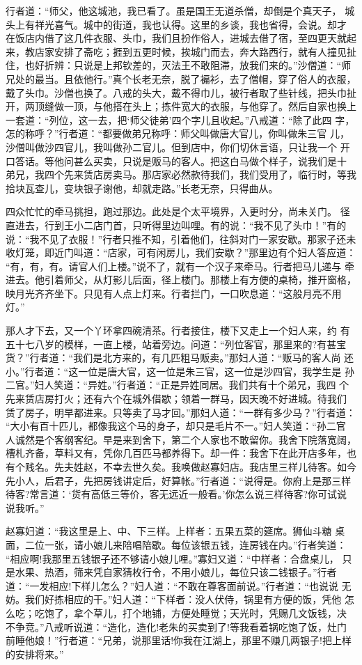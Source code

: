 行者道：“师父，他这城池，我已看了。虽是国王无道杀僧，却倒是个真天子，
城头上有祥光喜气。城中的街道，我也认得。这里的乡谈，我也省得，会说。却才
在饭店内借了这几件衣服、头巾，我们且扮作俗人，进城去借了宿，至四更天就起
来，教店家安排了斋吃；捱到五更时候，挨城门而去，奔大路西行，就有人撞见扯
住，也好折辨：只说是上邦钦差的，灭法王不敢阻滞，放我们来的。”沙僧道：“师
兄处的最当。且依他行。”真个长老无奈，脱了褊衫，去了僧帽，穿了俗人的衣服，
戴了头巾。沙僧也换了。八戒的头大，戴不得巾儿，被行者取了些针线，把头巾扯
开，两顶缝做一顶，与他搭在头上；拣件宽大的衣服，与他穿了。然后自家也换上
一套道：“列位，这一去，把‘师父徒弟’四个字儿且收起。”八戒道：“除了此四
字，怎的称呼？”行者道：“都要做弟兄称呼：师父叫做唐大官儿，你叫做朱三官
儿，沙僧叫做沙四官儿，我叫做孙二官儿。但到店中，你们切休言语，只让我一个
开口答话。等他问甚么买卖，只说是贩马的客人。把这白马做个样子，说我们是十
弟兄，我四个先来赁店房卖马。那店家必然款待我们，我们受用了，临行时，等我
拾块瓦查儿，变块银子谢他，却就走路。”长老无奈，只得曲从。

四众忙忙的牵马挑担，跑过那边。此处是个太平境界，入更时分，尚未关门。
径直进去，行到王小二店门首，只听得里边叫哩。有的说：“我不见了头巾！”有的
说：“我不见了衣服！”行者只推不知，引着他们，往斜对门一家安歇。那家子还未
收灯笼，即近门叫道：“店家，可有闲房儿，我们安歇？”那里边有个妇人答应道：
“有，有，有。请官人们上楼。”说不了，就有一个汉子来牵马。行者把马儿递与
牵进去。他引着师父，从灯影儿后面，径上楼门。那楼上有方便的桌椅，推开窗格，
映月光齐齐坐下。只见有人点上灯来。行者拦门，一口吹息道：“这般月亮不用灯。”

那人才下去，又一个丫环拿四碗清茶。行者接住，楼下又走上一个妇人来，约
有五十七八岁的模样，一直上楼，站着旁边。问道：“列位客官，那里来的?有甚宝
货？”行者道：“我们是北方来的，有几匹粗马贩卖。”那妇人道：“贩马的客人尚
还小。”行者道：“这一位是唐大官，这一位是朱三官，这一位是沙四官，我学生是
孙二官。”妇人笑道：“异姓。”行者道：“正是异姓同居。我们共有十个弟兄，我四
个先来赁店房打火；还有六个在城外借歇；领着一群马，因天晚不好进城。待我们
赁了房子，明早都进来。只等卖了马才回。”那妇人道：“一群有多少马？”行者道：
“大小有百十匹儿，都像我这个马的身子，却只是毛片不一。”妇人笑道：“孙二官
人诚然是个客纲客纪。早是来到舍下，第二个人家也不敢留你。我舍下院落宽阔，
槽札齐备，草料又有，凭你几百匹马都养得下。却一件：我舍下在此开店多年，也
有个贱名。先夫姓赵，不幸去世久矣。我唤做赵寡妇店。我店里三样儿待客。如今
先小人，后君子，先把房钱讲定后，好算帐。”行者道：“说得是。你府上是那三样
待客?常言道：‘货有高低三等价，客无远近一般看。’你怎么说三样待客?你可试说
说我听。”

赵寡妇道：“我这里是上、中、下三样。上样者：五果五菜的筵席。狮仙斗糖
桌面，二位一张，请小娘儿来陪唱陪歇。每位该银五钱，连房钱在内。”行者笑道：
“相应啊!我那里五钱银子还不够请小娘儿哩。”寡妇又道：“中样者：合盘桌儿，
只是水果、热酒，筛来凭自家猜枚行令，不用小娘儿，每位只该二钱银子。”行者
道：“一发相应!下样儿怎么？”妇人道：“不敢在尊客面前说。”行者道：“也说说
无妨。我们好拣相应的干。”妇人道：“下样者：没人伏侍，锅里有方便的饭，凭他
怎么吃；吃饱了，拿个草儿，打个地铺，方便处睡觉；天光时，凭赐几文饭钱，决
不争竞。”八戒听说道：“造化，造化!老朱的买卖到了!等我看着锅吃饱了饭，灶门
前睡他娘！”行者道：“兄弟，说那里话!你我在江湖上，那里不赚几两银子!把上样
的安排将来。”

